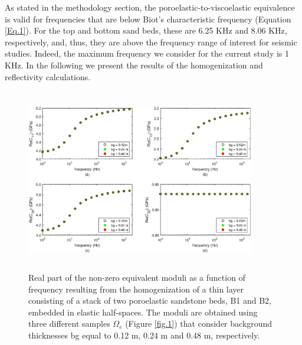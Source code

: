 \documentclass[draft]{agujournal2019}
\begin{document}
As stated in the methodology section, the poroelastic-to-viscoelastic equivalence is valid for frequencies that are below Biot's characteristic frequency (Equation \eqref{Eq.1}). For the top and bottom sand beds, these are 6.25 KHz and 8.06 KHz, respectively, and, thus, they are above the frequency range of interest for seismic studies. Indeed, the maximum frequency we consider for the current study is 1 KHz. 
In the following we present the results of the homogenization and reflectivity calculations.
\begin{figure}[!ht]
\centering
        \includegraphics[width=100mm, height=80mm]{cijbg_2sandshaleU.eps}
\caption{Real part of the non-zero equivalent moduli as a function of frequency resulting from the homogenization of a thin layer consisting of a stack of two poroelastic sandstone beds, B1 and B2, embedded in elastic half-spaces. The moduli are obtained using three different samples $\Omega_e$ (Figure \ref{fig.1}) that consider background thicknesses bg equal to 0.12 m, 0.24 m and 0.48 m, respectively.}
\label{fig.2}
\end{figure}
\end{document}

